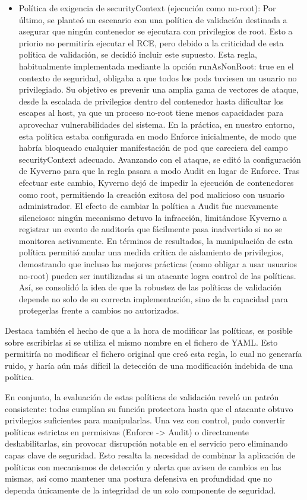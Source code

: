 \documentclass[12pt,twoside,titlepage]{report}
\begin{document}
\begin{itemize}
ataque de la infraestructura se amplía drásticamente sin señales claras, ya que las protecciones siguen existiendo pero “silenciadas”.
    \item Política de exigencia de securityContext (ejecución como no-root): Por último, se planteó un escenario con una política de validación destinada a asegurar que ningún contenedor se ejecutara con privilegios de root. Esto a priorio no permitiría ejecutar el RCE, pero debido a la criticidad de esta política de validación, se decidió incluir este supuesto. Esta regla, habitualmente implementada mediante la opción runAsNonRoot: true en el contexto de seguridad, obligaba a que todos los pods tuviesen un usuario no privilegiado. Su objetivo es prevenir una amplia gama de vectores de ataque, desde la escalada de privilegios dentro del contenedor hasta dificultar los escapes al host, ya que un proceso no-root tiene menos capacidades para aprovechar vulnerabilidades del sistema. En la práctica, en nuestro entorno, esta política estaba configurada en modo Enforce inicialmente, de modo que habría bloqueado cualquier manifestación de pod que careciera del campo securityContext adecuado. Avanzando con el ataque, se editó la configuración de Kyverno para que la regla pasara a modo Audit en lugar de Enforce. Tras efectuar este cambio, Kyverno dejó de impedir la ejecución de contenedores como root, permitiendo la creación exitosa del pod malicioso con usuario administrador. El efecto de cambiar la política a Audit fue nuevamente silencioso: ningún mecanismo detuvo la infracción, limitándose Kyverno a registrar un evento de auditoría que fácilmente pasa inadvertido si no se monitorea activamente. En términos de resultados, la manipulación de esta política permitió anular una medida crítica de aislamiento de privilegios, demostrando que incluso las mejores prácticas (como obligar a usar usuarios no-root) pueden ser inutilizadas si un atacante logra control de las políticas. Así, se consolidó la idea de que la robustez de las políticas de validación depende no solo de su correcta implementación, sino de la capacidad para protegerlas frente a cambios no autorizados.
\end{itemize}
Destaca también el hecho de que a la hora de modificar las políticas, es posible sobre escribirlas si se utiliza el mismo nombre en el fichero de YAML. Esto permitiría no modificar el fichero original que creó esta regla, lo cual no generaría ruido, y haría aún más difícil la detección de una modificación indebida de una política.

En conjunto, la evaluación de estas políticas de validación reveló un patrón consistente: todas cumplían su función protectora hasta que el atacante obtuvo privilegios suficientes para manipularlas. Una vez con control, pudo convertir políticas estrictas en permisivas (Enforce -> Audit) o directamente deshabilitarlas, sin provocar disrupción notable en el servicio pero eliminando capas clave de seguridad. Esto resalta la necesidad de combinar la aplicación de políticas con mecanismos de detección y alerta que avisen de cambios en las mismas, así como mantener una postura defensiva en profundidad que no dependa únicamente de la integridad de un solo componente de seguridad.
\end{document}
